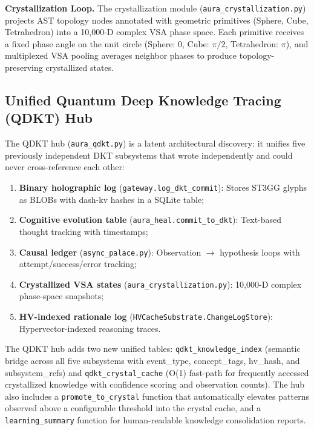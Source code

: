 \documentclass[11pt]{article}
\begin{document}
\textbf{Crystallization Loop.} The crystallization module (\texttt{aura\_crystallization.py}) projects AST topology nodes annotated with geometric primitives (Sphere, Cube, Tetrahedron) into a 10,000-D complex VSA phase space. Each primitive receives a fixed phase angle on the unit circle (Sphere: $0$, Cube: $\pi/2$, Tetrahedron: $\pi$), and multiplexed VSA pooling averages neighbor phases to produce topology-preserving crystallized states.

\subsection{Unified Quantum Deep Knowledge Tracing (QDKT) Hub}

The QDKT hub (\texttt{aura\_qdkt.py}) is a latent architectural discovery: it unifies five previously independent DKT subsystems that wrote independently and could never cross-reference each other:

\begin{enumerate}[label=(\arabic*)]
    \item \textbf{Binary holographic log} (\texttt{gateway.log\_dkt\_commit}): Stores ST3GG glyphs as BLOBs with dash-kv hashes in a SQLite table;
    \item \textbf{Cognitive evolution table} (\texttt{aura\_heal.commit\_to\_dkt}): Text-based thought tracking with timestamps;
    \item \textbf{Causal ledger} (\texttt{async\_palace.py}): Observation $\rightarrow$ hypothesis loops with attempt/success/error tracking;
    \item \textbf{Crystallized VSA states} (\texttt{aura\_crystallization.py}): 10,000-D complex phase-space snapshots;
    \item \textbf{HV-indexed rationale log} (\texttt{HVCacheSubstrate.ChangeLogStore}): Hypervector-indexed reasoning traces.
\end{enumerate}

The QDKT hub adds two new unified tables: \texttt{qdkt\_knowledge\_index} (semantic bridge across all five subsystems with event\_type, concept\_tags, hv\_hash, and subsystem\_refs) and \texttt{qdkt\_crystal\_cache} (O(1) fast-path for frequently accessed crystallized knowledge with confidence scoring and observation counts). The hub also includes a \texttt{promote\_to\_crystal} function that automatically elevates patterns observed above a configurable threshold into the crystal cache, and a \texttt{learning\_summary} function for human-readable knowledge consolidation reports.
\end{document}
